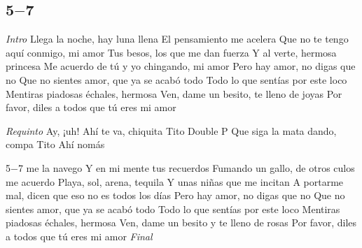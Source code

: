 \subsection{5$-$7}
\noindent

\vspace{1cm}

\begin{guitar}
	\begin{multicols}{2}
		\textit{Intro}
	Llega la noche, hay luna llena
	El pensamiento me acelera
	Que no te tengo aquí conmigo, mi amor
	Tus besos, los que me dan fuerza
	Y al verte, hermosa princesa
	Me acuerdo de tú y yo chingando, mi amor
	Pero hay amor, no digas que no
	Que no sientes amor, que ya se acabó todo
	Todo lo que sentías por este loco
	Mentiras piadosas échales, hermosa
	Ven, dame un besito, te lleno de joyas
	Por favor, diles a todos que tú eres mi amor
	\par
	\textit{Requinto}
	Ay, ¡uh!
	Ahí te va, chiquita
	Tito Double P
	Que siga la mata dando, compa Tito
	Ahí nomás

	\par
	5$-$7 me la navego
	Y en mi mente tus recuerdos
	Fumando un gallo, de otros culos me acuerdo
	Playa, sol, arena, tequila
	Y unas niñas que me incitan
	A portarme mal, dicen que eso no es todos los días
	Pero hay amor, no digas que no
	Que no sientes amor, que ya se acabó todo
	Todo lo que sentías por este loco
	Mentiras piadosas échales, hermosa
	Ven, dame un besito y te lleno de rosas
	Por favor, diles a todos que tú eres mi amor
		\textit{Final}
	\end{multicols}
\end{guitar}
